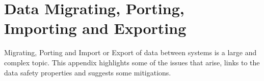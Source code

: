 %
\chapter{Data Migrating, Porting, Importing and Exporting}\label{bkm:migration}
%

Migrating, Porting and Import or Export of data between systems is a large and complex topic.
This appendix highlights some of the issues that arise, links to the data safety properties and suggests some mitigations.

